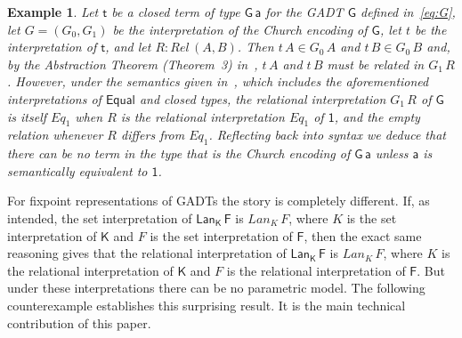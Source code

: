 \documentclass[submission,copyright,creativecommons]{eptcs}
\newtheorem{example}[thm]{Example}
\begin{document}
\begin{example}\label{ex:CE-par}
Let $\mathsf{t}$ be a closed term of type $\mathsf{G\,a}$ for the GADT
$\mathsf{G}$ defined in~\eqref{eq:G}, let $G = (G_0,G_1)$ be the
interpretation of the Church encoding of $\mathsf{G}$, let $t$ be the
interpretation of $\mathsf{t}$, and let $R :
\mathit{Rel}\,(A,B)$. Then $t\, A \in G_0\,A$ and $t\,B \in G_0\,B$
and, by the Abstraction Theorem (Theorem~3) in~\cite{atk12}, $t\,A$
and $t\,B$ must be related in $G_1\,R$. However, under the semantics
given in~\cite{atk12}, which includes the aforementioned
interpretations of $\mathsf{Equal}$ and closed types, the relational
interpretation $G_1\,R$ of $\mathsf{G}$ is itself $\mathit{Eq}_1$ when
$R$ is the relational interpretation $\mathit{Eq}_1$ of $\mathsf{1}$,
and the empty relation whenever $R$ differs from
$\mathit{Eq}_1$. Reflecting back into syntax we deduce that there can
be no term in the type that is the Church encoding of $\mathsf{G\,a}$
unless $\mathsf{a}$ is semantically equivalent to $\mathsf{1}$.
\end{example}

For fixpoint representations of GADTs the story is completely
different. If, as intended, the set interpretation of
$\mathsf{Lan_K\,F}$ is $\mathit{Lan}_K\,F$, where $K$ is the set
interpretation of $\mathsf{K}$ and $F$ is the set interpretation of
$\mathsf{F}$, then the exact same reasoning gives that the relational
interpretation of $\mathsf{Lan_K\,F}$ is $\mathit{Lan}_K\,F$, where
$K$ is the relational interpretation of $\mathsf{K}$ and $F$ is the
relational interpretation of $\mathsf{F}$. But under these
interpretations there can be no parametric model. The following
counterexample establishes this surprising result. It is the main
technical contribution of this paper.
\end{document}
